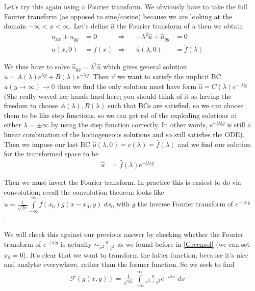 \documentclass[10pt]{report}
\newcommand{\abs}[1]{\left|#1\right|}
\begin{document}
Let's try this again using a Fourier transform. We obviously have to take the full Fourier transform (as opposed to sine/cosine) because we are looking at the domain $-\infty < x < \infty$. Let's define $\hat{u}$ the Fourier transform of $u$ then we obtain
\begin{align}
    u_{xx} + u_{yy} &= 0 &\Rightarrow&& -\lambda^2 \hat{u} + \hat{u}_{yy} &= 0\\
    u(x,0) &= f(x) &\Rightarrow&& \hat{u}(\lambda,0) &= \hat{f}(\lambda)
\end{align}

We thus have to solve $\hat{u}_{yy} = \lambda^2 \hat{u}$ which gives general solution $\hat{u} = A(\lambda)e^{\lambda y} + B(\lambda) e^{-\lambda y}$. Then if we want to satisfy the implicit BC $\hat{u}(y \to \infty) \to 0$ then we find the only solution must have form $\hat{u} = C(\lambda)e^{-\abs{\lambda}y}$ (She really waved her hands hard here; you should think of it as having the freedom to choose $A(\lambda), B(\lambda)$ such that BCs are satisfied, so we can choose them to be like step functions, so we can get rid of the exploding solutions at either $\lambda = \pm \infty$ by using the step function correctly. In other words, $e^{-\abs{\lambda} y}$ is still a linear combination of the homogeneous solutions and so still satisfies the ODE). Then we impose our last BC $\hat{u}(\lambda,0) = c(\lambda) = \hat{f}(\lambda)$ and we find our solution for the transformed space to be
\begin{align}
    \hat{u} &= \hat{f}(\lambda)e^{-\abs{\lambda}y}
\end{align}

Then we must invert the Fourier transform. In practice this is easiest to do via convolution; recall the convolution theorem looks like $u = \frac{1}{\sqrt{2\pi}}\int\limits_{-\infty}^{\infty}f(x_0)g(x-x_0,y)\;dx_0$ with $g$ the inverse Fourier transform of $e^{-\abs{\lambda}y}$.

We will check this against our previous answer by checking whether the Fourier transform of $e^{-\abs{\lambda }y}$ is actually $\sim \frac{y}{x^2 + y^2}$ as we found before in \eqref{Greensol} (we can set $x_0 = 0$). It's clear that we want to transform the latter function, because it's nice and analytic everywhere, rather than the former function. So we seek to find
\begin{align}
    \mathcal{F}\left( g(x,y) \right) = \frac{1}{\sqrt{2\pi}}\int\limits_{-\infty}^{\infty}\frac{y}{x^2 + y^2}e^{-i\lambda x}\;dx
\end{align}
\end{document}
